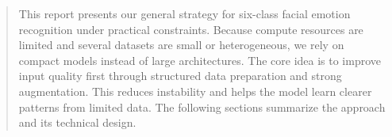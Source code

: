 \begin{abstract}
This report presents our general strategy for six-class facial emotion recognition under practical constraints.
Because compute resources are limited and several datasets are small or heterogeneous, we rely on compact models instead of large architectures.
The core idea is to improve input quality first through structured data preparation and strong augmentation.
This reduces instability and helps the model learn clearer patterns from limited data.
The following sections summarize the approach and its technical design.
\end{abstract}
